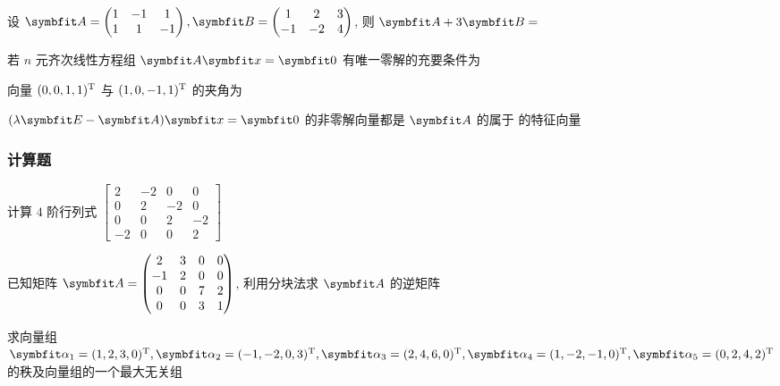 \begin{ti}
	设 $\bA = \begin{pmatrix}
		1 & -1 & 1 \\
		1 & 1 & -1
	\end{pmatrix}, \bB = \begin{pmatrix}
		1 & 2 & 3 \\
		-1 & -2 & 4
	\end{pmatrix}$, 则 $\bA + 3 \bB = $ \hua
\end{ti}

\begin{ti}
	若 $n$ 元齐次线性方程组 $\bA \symbfit x = \symbfit 0$ 有唯一零解的充要条件为 \hua
\end{ti}

\begin{ti}
	向量 $(0,0,1,1)^{\mathrm{T}}$ 与 $(1,0,-1,1)^{\mathrm{T}}$ 的夹角为 \hua
\end{ti}

\begin{ti}
	$(\lambda \bE - \bA) \symbfit x = \symbfit 0$ 的非零解向量都是 $\bA$ 的属于 \hua{} 的特征向量
\end{ti}

\subsubsection{计算题}
\begin{ti}[10 分]
	计算 $4$ 阶行列式 $\begin{bmatrix}
		2 & -2 & 0 & 0 \\
		0 & 2 & -2 & 0 \\
		0 & 0 & 2 & -2 \\
		-2 & 0 & 0 & 2
	\end{bmatrix}$
\end{ti}

\begin{ti}[10 分]
	已知矩阵 $\bA = \begin{pmatrix}
		2 & 3 & 0 & 0 \\
		-1 & 2 & 0 & 0 \\
		0 & 0 & 7 & 2 \\
		0 & 0 & 3 & 1
	\end{pmatrix}$, 利用分块法求 $\bA$ 的逆矩阵
\end{ti}

\begin{ti}[10 分]
	求向量组 $\balpha_{1} = (1,2,3,0)^{\TT}, \balpha_{2} = (-1,-2,0,3)^{\TT}, \balpha_{3} = (2,4,6,0)^{\TT}, \balpha_{4} = (1,-2,-1,0)^{\TT}, \balpha_{5} = (0,2,\allowbreak 4,2)^{\TT}$ 的秩及向量组的一个最大无关组
\end{ti}

